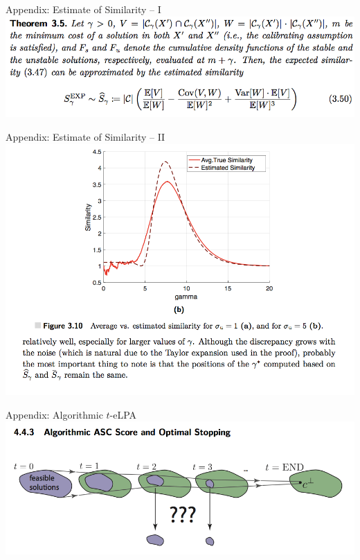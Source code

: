 \documentclass[presentation,12pt]{beamer}
\begin{document}
\begin{frame}{Appendix: Estimate of Similarity -- I}
  \centering
  \includegraphics[width=\textwidth]{theor-sim.png}
\end{frame}

\begin{frame}{Appendix: Estimate of Similarity -- II}
  \centering
  \includegraphics[width=\textwidth]{annealed-sim.png}
\end{frame}

\begin{frame}{Appendix: Algorithmic $t$-eLPA}
  \centering
  \includegraphics[width=\textwidth]{algorithmic-elpa.png}
\end{frame}
\end{document}
